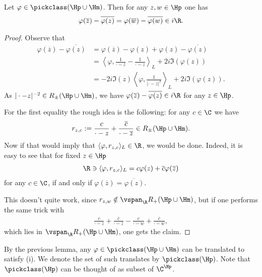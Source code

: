 \begin{lem}\label{pick_predual_1}
	Let $\varphi \in \pickclass(\Hp \cup \Hm)$. Then for any $z, w \in \Hp$ one has
	\begin{align*}
		\varphi(\overline{z}) - \overline{\varphi(z)} = \varphi(\overline{w}) - \overline{\varphi(w)} \in i \R.
	\end{align*}
\end{lem}
\begin{proof}
	Observe that
	\begin{align*}
		\varphi(\overline{z}) - \overline{\varphi(z)} &= \varphi(\overline{z}) - \varphi(z) + \varphi(z) - \overline{\varphi(z)}\\
		&= \left\langle \varphi, \frac{1}{\cdot - \overline{z}} - \frac{1}{\cdot - z} \right\rangle_{L} + 2 i \Im(\varphi(z)) \\
		&= - 2 i \Im(z) \left\langle \varphi, \frac{1}{|\cdot - z|^2} \right\rangle_{L} + 2 i \Im(\varphi(z)).
	\end{align*}
	As $|\cdot - z|^{-2} \in R_{\pm}(\Hp \cup \Hm)$, we have $\varphi(\overline{z}) - \overline{\varphi(z)} \in i \R$ for any $z \in \Hp$.

	For the first equality the rough idea is the following: for any $c \in \C$ we have
	\begin{align*}
		r_{z, c} := \frac{c}{\cdot - z} + \frac{\overline{c}}{\cdot - \overline{z}} \in R_{\pm}(\Hp \cup \Hm).
	\end{align*}
	Now if that would imply that $\langle \varphi, r_{z, c} \rangle_{L} \in \R$, we would be done. Indeed, it is easy to see that for fixed $z \in \Hp$
	\begin{align*}
		\R \ni \langle \varphi, r_{z, c} \rangle_{L} = c \varphi(z) + \overline{c} \varphi(\overline{z})
	\end{align*}
	for any $c \in \C$, if and only if $\varphi(\overline{z}) = \overline{\varphi(z)}$.

	This doesn't quite work, since $r_{z, w} \notin \vspan_{\R} R_{+}(\Hp \cup \Hm)$, but if one performs the same trick with
	\begin{align*}
		\frac{c}{\cdot - z} + \frac{\overline{c}}{\cdot - \overline{z}} - \frac{c}{\cdot - w} + \frac{\overline{c}}{\cdot - \overline{w}},
	\end{align*}
	which lies in $\vspan_{\R}R_{+}(\Hp \cup \Hm)$, one gets the claim.
\end{proof}

By the previous lemma, any $\varphi \in \pickclass(\Hp \cup \Hm)$ can be translated to satisfy (i). We denote the set of such translates by $\pickclass(\Hp)$. Note that $\pickclass(\Hp)$ can be thought of as subset of $\C^{\Hp}$.

